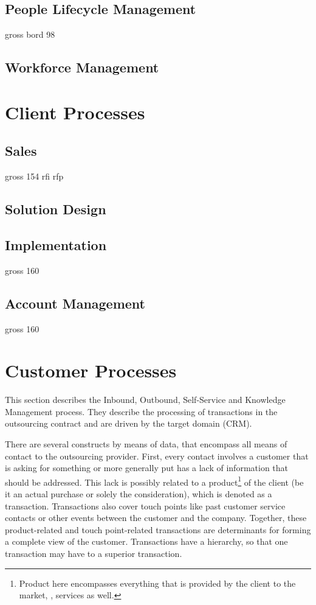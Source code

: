 	\subsection{People Lifecycle Management}
	gross bord 98
	
	\subsection{Workforce Management}
	
	\section{Client Processes}
	\subsection{Sales}
	gross 154 rfi rfp
	\subsection{Solution Design}
	\subsection{Implementation}
	gross 160
	\subsection{Account Management}
	gross 160
	\section{Customer Processes}
	
	This section describes the Inbound, Outbound, Self-Service and Knowledge Management process. They describe the processing of transactions in the outsourcing contract and are driven by the target domain (\acrshort{CRM}). 
	
	There are several constructs by means of data, that encompass all means of contact to the outsourcing provider. First, every contact involves a customer that is asking for something or more generally put has a lack of information that should be addressed. This lack is possibly related to a product\footnote{Product here encompasses everything that is provided by the client to the market, \ie, services as well.} of the client (be it an actual purchase or solely the consideration), which is denoted as a transaction. Transactions also cover touch points like past customer service contacts or other events between the customer and the company. Together, these product-related and touch point-related transactions are determinants for forming a complete view of the customer. Transactions have a hierarchy, so that one transaction may have to a superior transaction. 
	

